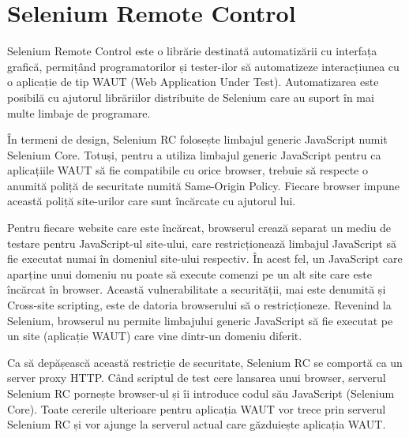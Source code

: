 \documentclass[12pt]{book}
\begin{document}
\section{Selenium Remote Control}

Selenium Remote Control este o librărie destinată automatizării cu interfața grafică, permițând programatorilor și tester-ilor să automatizeze interacțiunea cu o aplicație de tip WAUT (Web Application Under Test). Automatizarea este posibilă cu ajutorul librăriilor distribuite de Selenium care au suport în mai multe limbaje de programare.

În termeni de design, Selenium RC folosește limbajul generic JavaScript numit Selenium Core. Totuși, pentru a utiliza limbajul generic JavaScript pentru ca aplicațiile WAUT să fie compatibile cu orice browser, trebuie să respecte o anumită poliță de securitate numită Same-Origin Policy. Fiecare browser impune această poliță site-urilor care sunt încărcate cu ajutorul lui. 

Pentru fiecare website care este încărcat, browserul crează separat un mediu de testare pentru JavaScript-ul site-ului, care restricționează limbajul JavaScript să fie executat numai în domeniul site-ului respectiv. În acest fel, un JavaScript care aparține unui domeniu nu poate să execute comenzi pe un alt site care este încărcat în browser. Această vulnerabilitate a securității, mai este denumită și Cross-site scripting, este de datoria browserului să o restricționeze. Revenind la Selenium, browserul nu permite limbajului generic JavaScript să fie executat pe un site (aplicație WAUT) care vine dintr-un domeniu diferit.

Ca să depășească această restricție de securitate, Selenium RC se comportă ca un server proxy HTTP. Când scriptul de test cere lansarea unui browser, serverul Selenium RC pornește browser-ul și îi introduce codul său JavaScript (Selenium Core). Toate cererile ulterioare pentru aplicația WAUT vor trece prin serverul Selenium RC și vor ajunge la serverul actual care găzduiește aplicația WAUT. \cite{SeleniumBook}
\end{document}
